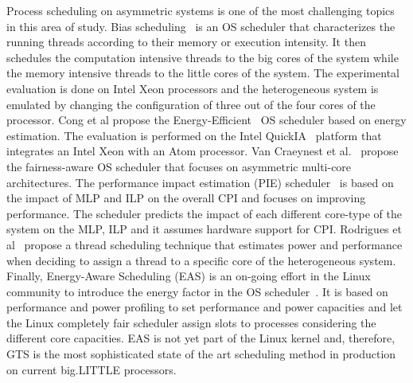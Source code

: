 Process scheduling on asymmetric systems is one of the most challenging topics in this area of study.
Bias scheduling~\cite{Koufaty_bias} is an OS scheduler that characterizes the running 
threads according to their memory or execution intensity. 
It then schedules the computation intensive threads to the big cores of the system while the memory intensive threads to the little cores of the system.
The experimental evaluation is done on Intel Xeon processors and the heterogeneous system is emulated by changing the configuration of three out of the four cores of the processor.
Cong et al propose the Energy-Efficient~\cite{Cong_quickIA} OS scheduler based on energy estimation. The evaluation is performed on the Intel QuickIA~\cite{quickIA} platform that integrates an Intel Xeon with an Atom processor. 
Van Craeynest et al.~\cite{VanCraeynest_fairness} propose the fairness-aware OS scheduler that 
focuses on asymmetric multi-core 
architectures. 
The performance impact estimation (PIE) scheduler~\cite{VanCraeynest_PIE} is based on the impact of MLP and ILP on the overall CPI and focuses on improving performance.
The scheduler predicts the impact of each different core-type of the system on the MLP, ILP and it assumes hardware support for CPI. 
Rodrigues et al~\cite{Rodrigues_thread_scheduling} propose a thread scheduling technique that estimates power and performance when deciding to assign a thread to a specific core of the heterogeneous system. 
Finally, Energy-Aware Scheduling (EAS) is an on-going effort in the Linux community to introduce 
the energy factor in the OS scheduler~\cite{EAS, EAS_Linux}. It is based on performance and power 
profiling to set performance and power capacities and let the Linux completely fair scheduler 
assign slots to processes considering the different core capacities. EAS is not yet part 
of the Linux kernel and, therefore, GTS is the most sophisticated state of the art scheduling method 
in production on current big.LITTLE processors.





